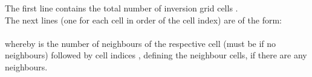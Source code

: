 The first line contains the total number of inversion grid cells .\\
The next  lines (one for each cell in order of the cell index) are of the form:\\
\\
whereby  is the number of neighbours of the respective cell (must be  if 
no neighbours) followed by  cell indices , defining 
the neighbour cells, if there are any neighbours.


